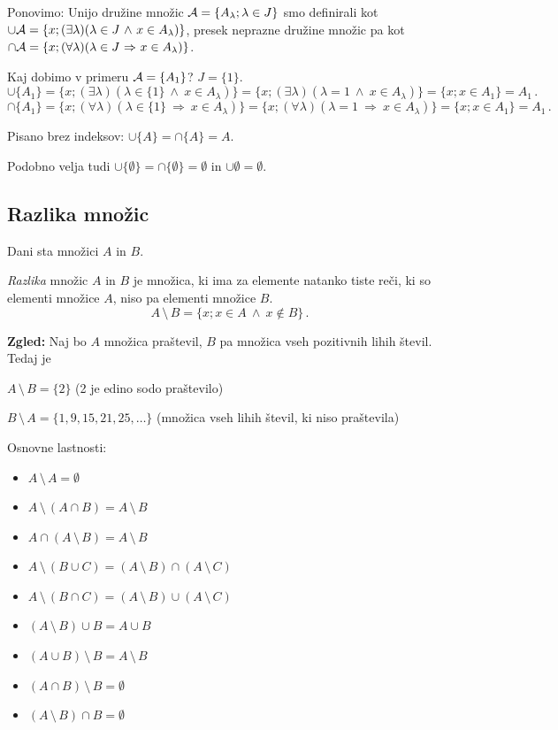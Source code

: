 \documentclass[11pt,paper=b5,DIV=13,headinclude,footinclude]{scrbook}
\def\inn {{~\wedge~}}
\def\sledi {{~\Rightarrow~}}
\def\brez {{\,\setminus\,}}
\begin{document}
Ponovimo: Unijo družine množic ${\cal A} = \{A_\lambda; \lambda \in J\}$ smo definirali kot\\
$\cup {\cal A} = \{x;(\exists \lambda) (\lambda \in J\inn x\in A_\lambda)\}$, presek neprazne družine množic pa kot \\
\hbox{$\cap {\cal A} = \{x;(\forall \lambda) (\lambda \in J\sledi x\in A_\lambda)\}$.}

Kaj dobimo v primeru ${\cal A} = \{A_1\}$? $J= \{1\}$.
$$\cup \{A_1\}
= \{x;(\exists \lambda) (\lambda \in \{1\}\inn x\in A_\lambda)\}
= \{x;(\exists \lambda) (\lambda = 1 \inn x\in A_\lambda)\}
 = \{x;x\in A_1\} = A_1\,.$$
$$\cap \{A_1\} =
\{x;(\forall \lambda) (\lambda \in \{1\}\sledi x\in A_\lambda)\}
= \{x;(\forall \lambda)(\lambda= 1\sledi x\in A_\lambda)\}
 = \{x;x\in A_1\} = A_1\,.$$

Pisano brez indeksov: $\cup \{A\} = \cap \{A\} = A$.

Podobno velja tudi $\cup \{\emptyset\} = \cap \{\emptyset\} = \emptyset$ in $\cup \emptyset = \emptyset$.


\subsection{Razlika množic}

Dani sta množici $A$ in $B$.

{\em Razlika} množic $A$ in $B$ je množica, ki ima za elemente natanko tiste reči, ki so elementi množice $A$, niso pa elementi množice $B$.
$$A\brez B = \{x; x\in A\inn x\not\in B\}\,.$$

\textbf{ Zgled:}
Naj bo $A$ množica praštevil, $B$ pa množica vseh pozitivnih lihih števil.
Tedaj je

$A\brez B = \{2\}$ (2 je edino sodo praštevilo)

$B\brez A = \{1,9,15,21,25,\ldots\}$ (množica vseh lihih števil, ki niso praštevila)

\bigskip

Osnovne lastnosti:

\begin{itemize}
  \item $A\brez A = \emptyset$

  \item $A\brez (A\cap B) = A\brez B$

  \item $A\cap (A\brez B) = A\brez B$

  \item $A\brez (B\cup C) = (A\brez B)\cap (A\brez C)$

  \item $A\brez (B\cap C) = (A\brez B)\cup (A\brez C)$

  \item $(A\brez B)\cup B = A\cup B$

  \item $(A\cup B)\brez B = A\brez B$

  \item $(A\cap B)\brez B = \emptyset$

  \item $(A\brez B)\cap B = \emptyset$
\end{itemize}
\end{document}

